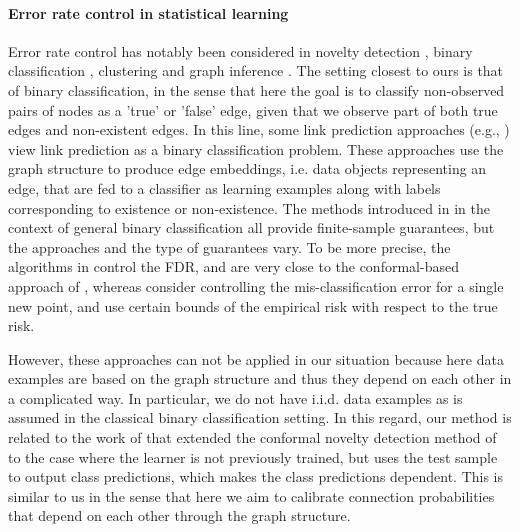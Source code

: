 \documentclass[a4paper, 11pt]{article}
\theoremstyle{remark}
\begin{document}
\paragraph{Error rate control in statistical learning}
Error rate control has notably been considered in novelty detection \citep{bates2023testing, yang2021bonus, marandon22b, liang2022integrative}, binary classification \citep{geifman17, angelopoulos2022learn, rava2021burden, jin2022selection}, clustering \citep{marandon22a} and graph inference \citep{rebafka22}. 
The setting closest to ours is that of binary classification, 
in the sense that here
the goal is to classify non-observed pairs of nodes as a 'true' or 'false' edge, given that we observe part of both true edges and non-existent edges.
In this line, some link prediction approaches (e.g., \citealp{zhang2018link}) view link prediction as a binary classification problem. These approaches use the graph structure to produce edge embeddings, i.e. data objects representing an edge, that are fed to a classifier as learning examples along with labels corresponding to existence or non-existence. 
The methods introduced in \cite{geifman17, angelopoulos2022learn, rava2021burden, jin2022selection} in the context of general binary classification all provide finite-sample guarantees, but the approaches and the type of guarantees vary. To be more precise, the algorithms in \cite{rava2021burden, jin2022selection} control the FDR, and are very close to the conformal-based approach of \cite{bates2023testing}, whereas \cite{geifman17, angelopoulos2022learn} consider controlling the mis-classification error for a single new point, and use certain bounds of the empirical risk with respect to the true risk. 

However, these approaches can not be applied in our situation because here data examples are based on the graph structure and thus they depend on each other in a complicated way. In particular, we do not have i.i.d. data examples as is assumed in the classical binary classification setting. 
In this regard, our method is related to the work of \cite{marandon22b} that extended the conformal novelty detection method of \cite{bates2023testing} to the case where the learner is not previously trained, but uses the test sample to output class predictions, which makes the class predictions dependent. This is similar to us in the sense that here we aim to calibrate connection probabilities that depend on each other through the graph structure. 
 
\end{document}
